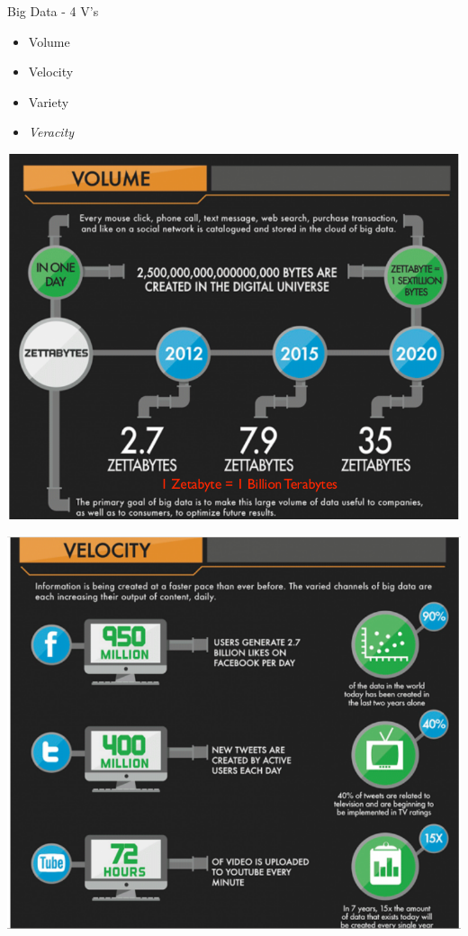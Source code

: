 \documentclass{beamer}
\begin{document}
\begin{frame}{Big Data - 4 V's}
    \begin{itemize}
        \item Volume
        \item Velocity
        \item Variety
        \item {\em Veracity}
    \end{itemize}
\end{frame}


\begin{frame}{}
    \begin{center}
        \includegraphics[scale=0.34]{bigDataVolume.png}
    \end{center}
\end{frame}
\begin{frame}{}
    \begin{center}
        \includegraphics[scale=0.34]{bigDataVelocity.png}
    \end{center}
\end{frame}
\end{document}

